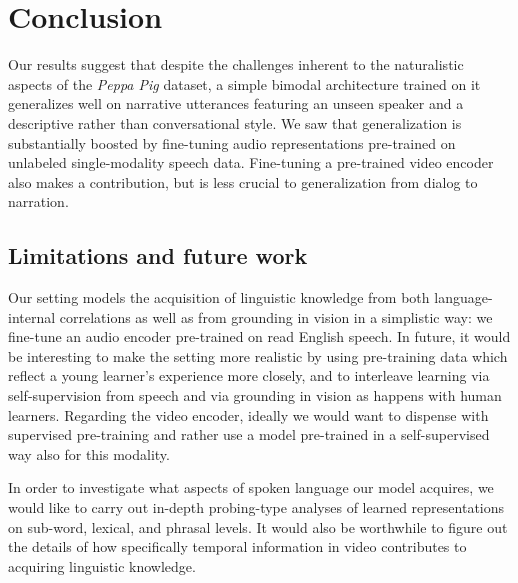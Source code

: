 \section{Conclusion}
\label{sec:conclusion}
Our results suggest that despite the challenges inherent to the
naturalistic aspects of the \emph{Peppa Pig} dataset, a simple bimodal
architecture trained on it generalizes well on narrative utterances
featuring an unseen speaker and a descriptive rather than
conversational style. We saw that generalization is substantially
boosted by fine-tuning audio representations pre-trained on unlabeled
single-modality speech data. Fine-tuning a pre-trained video encoder
also makes a contribution, but is less crucial to generalization from
dialog to narration.


\subsection{Limitations and future work}
\label{sec:limitations}
Our setting models the acquisition of linguistic knowledge from both
language-internal correlations as well as from grounding in vision in
a simplistic way: we fine-tune an audio encoder pre-trained on read
English speech. In future, it would be interesting to make the setting
more realistic by using pre-training data which reflect a young
learner's experience more closely, and to interleave learning via
self-supervision from speech and via grounding in vision as happens
with human learners.
%
Regarding the video encoder, ideally we would want to dispense with
supervised pre-training and rather use a model pre-trained in a
self-supervised way also for this modality.

In order to investigate what aspects of spoken language our model
acquires, we would like to carry out in-depth probing-type
analyses of learned representations on sub-word, lexical, and phrasal
levels. It would also be worthwhile to figure out the details of how
specifically temporal information in video contributes to acquiring
linguistic knowledge.




